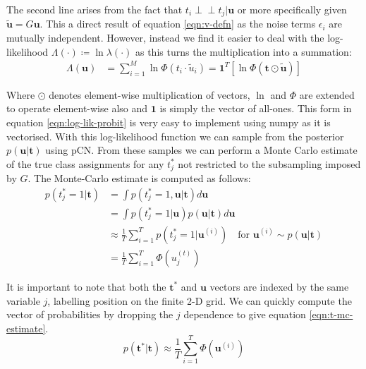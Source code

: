 \documentclass[]{article}
\newcommand{\lik}{\lambda}
\newcommand{\loglik}{\Lambda}
\newcommand{\indep}{\perp \!\!\! \perp}
\newcommand{\tbold}{\boldsymbol{t}}
\newcommand{\ubold}{\boldsymbol{u}}
\begin{document}
The second line arises from the fact that $t_i \indep t_j | \ubold$ or more specifically given $\tilde{\ubold} = G\ubold$. This a direct result of equation \ref{eqn:v-defn} as the noise terms $\epsilon_i$ are mutually independent. However, instead we find it easier to deal with the log-likelihood $\loglik(\cdot) \coloneqq \ln \lik(\cdot)$ as this turns the multiplication into a summation:
%
\begin{align}
	\loglik(\ubold) &= \sum_{i=1}^{M} \ln \Phi(t_i \cdot \tilde{u}_i) = \mathbf{1}^T \left[ \ln \Phi(\tbold \odot \tilde{\ubold}) \right]
	\label{eqn:log-lik-probit}
\end{align}

Where $\odot$ denotes element-wise multiplication of vectors, $\ln$ and $\Phi$ are extended to operate element-wise also and $\mathbf{1}$ is simply the vector of all-ones. This form in equation \ref{eqn:log-lik-probit} is very easy to implement using numpy as it is vectorised. With this log-likelihood function we can sample from the posterior $p(\ubold | \tbold)$ using pCN. From these samples we can perform a Monte Carlo estimate of the true class assignments for any $t^*_j$ not restricted to the subsampling imposed by $G$. The Monte-Carlo estimate is computed as follows:
%
\begin{align}
	p(t^*_j = 1 | \tbold) &= \int p(t^*_j = 1, \ubold | \tbold) d\ubold \nonumber \\
	&= \int p(t^*_j = 1 | \ubold) p(\ubold | \tbold) d\ubold \nonumber \\
	&\approx \frac{1}{T} \sum_{i=1}^{T} p \left( t^*_j = 1 | \ubold^{(i)} \right)
	\quad \textrm{for } \ubold^{(i)} \sim p(\ubold | \tbold) \nonumber \\
	&= \frac{1}{T} \sum_{i=1}^{T} \Phi \left( u^{(t)}_j \right)
\end{align}

It is important to note that both the $\tbold^*$ and $\ubold$ vectors are indexed by the same variable $j$, labelling position on the finite 2-D grid. We can quickly compute the vector of probabilities by dropping the $j$ dependence to give equation \ref{eqn:t-mc-estimate}.
%
\begin{equation}
	p(\tbold^* | \tbold) \approx \frac{1}{T} \sum_{i=1}^{T} \Phi \left( \ubold^{(i)} \right)
	\label{eqn:t-mc-estimate}
\end{equation}
\end{document}
